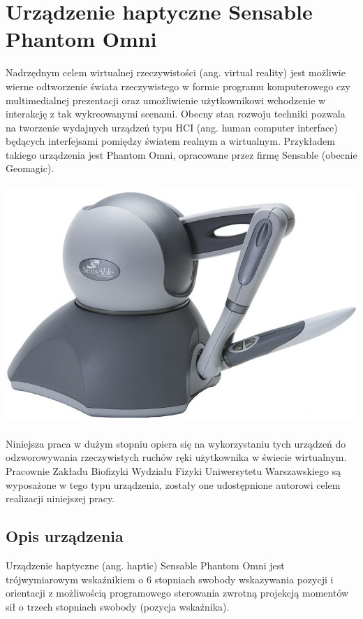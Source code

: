 \documentclass[licencjacka]{pracamgr}
\begin{document}
\chapter{Urządzenie haptyczne Sensable Phantom Omni}
Nadrzędnym celem wirtualnej rzeczywistości (ang. virtual reality) jest możliwie wierne odtworzenie świata rzeczywistego w formie programu komputerowego czy multimedialnej prezentacji oraz umożliwienie użytkownikowi wchodzenie w interakcję z tak wykreowanymi scenami. Obecny stan rozwoju techniki pozwala na tworzenie wydajnych urządzeń typu HCI (ang. human computer interface) będących interfejsami pomiędzy światem realnym a wirtualnym. Przykładem takiego urządzenia jest Phantom Omni, opracowane przez firmę Sensable (obecnie Geomagic). 
\\
\\
\includegraphics[scale=0.5,center]{Sensable_Phantom_Omni}
\\
\\

Niniejsza praca w dużym stopniu opiera się na wykorzystaniu tych urządzeń do odzworowywania rzeczywistych ruchów ręki użytkownika w świecie wirtualnym. Pracownie Zakładu Biofizyki Wydziału Fizyki Uniwersytetu Warszawskiego są wyposażone w tego typu urządzenia, zostały one udostępnione autorowi celem realizacji niniejszej pracy.

\section{Opis urządzenia}
Urządzenie haptyczne (ang. haptic) Sensable Phantom Omni jest trójwymiarowym wskaźnikiem o 6 stopniach swobody wskazywania pozycji i orientacji z możliwością programowego sterowania zwrotną projekcją momentów sił o trzech stopniach swobody (pozycja wskaźnika). 
\end{document}
